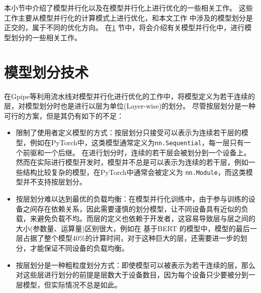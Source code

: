 本小节中介绍了模型并行化以及在模型并行化上进行优化的一些相关工作。
这些工作主要从模型并行化的计算模式上进行优化，和本文工作\sys{} 中涉及的模型划分是正交的，属于不同的优化方向。
在\ref{sec:partition} 节中，将会介绍有关模型并行化中，进行模型划分的一些相关工作。


\section{模型划分技术}
\label{sec:partition}

在Gpipe等利用流水线对模型并行化进行优化的工作中，将模型定义为若干连续的层，对模型划分时也是进行以层为单位(Layer-wise)的划分。
尽管按层划分是一种可行的方案，但是其仍有如下的不足：
\begin{itemize}
	\item 限制了使用者定义模型的方式：按层划分只接受可以表示为连续若干层的模型，例如在PyTorch中，这类模型通常定义为\texttt{nn.Sequential}，每一层只有一个前驱和一个后继。
	在进行划分时，连续的若干层会被划分到一个设备上。
	然而在实际进行模型开发时，模型并不总是可以表示为连续的若干层，例如一些结构比较复杂的模型，在PyTorch中通常会被定义为 \texttt{nn.Module}，而这类模型并不支持按层划分。
	\item 按层划分难以达到最优的负载均衡：在模型并行化训练中，由于参与训练的设备之间存在依赖关系，因此需要谨慎的划分模型，让不同设备具有近似的负载，来避免负载不均。而层的定义也依赖于开发者，这容易导致层与层之间的大小(参数量、运算量)区别很大，例如在 基于BERT  的模型中，模型的最后一层占据了整个模型40\%的计算时间，对于这种巨大的层，还需要进一步的划分，才能保证不同设备的负载均衡。
	\item 按层划分是一种粗粒度划分方式：即使模型可以被表示为若干连续的层，那么对这些层进行划分的前提是层数大于设备数目，因为每个设备只少要被分到一层模型，但实际情况不总是如此。
\end{itemize}


